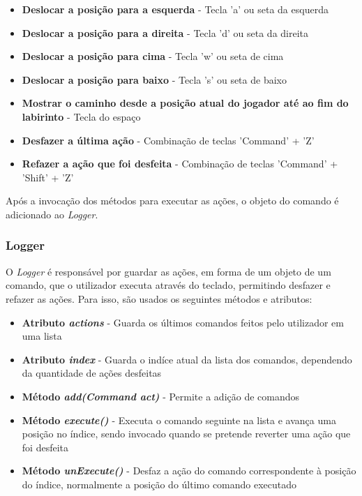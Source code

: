 \documentclass[10pt,portuguese]{article}
\begin{document}
\begin{itemize}
    \item \textbf{Deslocar a posição para a esquerda} - Tecla 'a' ou seta da esquerda
    \item \textbf{Deslocar a posição para a direita} - Tecla 'd' ou seta da direita
    \item \textbf{Deslocar a posição para cima} - Tecla 'w' ou seta de cima
    \item \textbf{Deslocar a posição para baixo} - Tecla 's' ou seta de baixo
    \item \textbf{Mostrar o caminho desde a posição atual do jogador até ao fim do labirinto} - Tecla do espaço
    \item \textbf{Desfazer a última ação} - Combinação de teclas 'Command' + 'Z'
    \item \textbf{Refazer a ação que foi desfeita} - Combinação de teclas 'Command' + 'Shift' + 'Z'
\end{itemize}

\par Após a invocação dos métodos para executar as ações, o objeto do comando é adicionado ao \textit{Logger}.

\subsubsection{Logger}

\par O \textit{Logger} é responsável por guardar as ações, em forma de um objeto de um comando, que o utilizador executa através do teclado, permitindo desfazer e refazer as ações. Para isso, são usados os seguintes métodos e atributos:

\begin{itemize}
    \item \textbf{Atributo \textit{actions}} - Guarda os últimos comandos feitos pelo utilizador em uma lista
    \item \textbf{Atributo \textit{index}} - Guarda o indíce atual da lista dos comandos, dependendo da quantidade de ações desfeitas
    \item \textbf{Método \textit{add(Command act)}} - Permite a adição de comandos
    \item \textbf{Método \textit{execute()}} - Executa o comando seguinte na lista e avança uma posição no índice, sendo invocado quando se pretende reverter uma ação que foi desfeita
    \item \textbf{Método \textit{unExecute()}} - Desfaz a ação do comando correspondente à posição do índice, normalmente a posição do último comando executado
\end{itemize}
\end{document}
